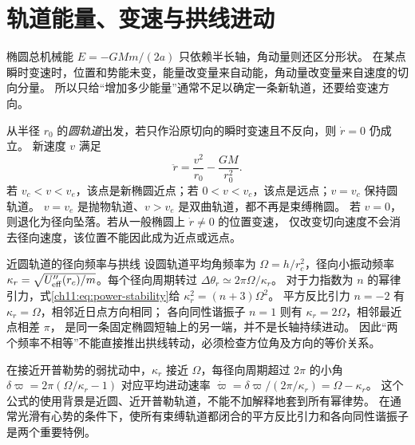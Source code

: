 \section{轨道能量、变速与拱线进动}
椭圆总机械能 $E=-GMm/(2a)$ 只依赖半长轴，角动量则还区分形状。
在某点瞬时变速时，位置和势能未变，能量改变量来自动能，角动量改变量来自速度的切向分量。
所以只给“增加多少能量”通常不足以确定一条新轨道，还要给变速方向。

从半径 $r_0$ 的\emph{圆轨道}出发，若只作沿原切向的瞬时变速且不反向，则 $\dot r=0$ 仍成立。
新速度 $v$ 满足
\[
 \ddot r=\frac{v^2}{r_0}-\frac{GM}{r_0^2}.
\]
若 $v_c<v<v_e$，该点是新椭圆近点；若 $0<v<v_c$，该点是远点；$v=v_c$ 保持圆轨道。
$v=v_e$ 是抛物轨道、$v>v_e$ 是双曲轨道，都不再是束缚椭圆。
若 $v=0$，则退化为径向坠落。若从一般椭圆上 $\dot r\ne0$ 的位置变速，
仅改变切向速度不会消去径向速度，该位置不能因此成为近点或远点。


\begin{starread}{近圆轨道的径向频率与拱线}
\label{ch11:sec:precession}
设圆轨道平均角频率为 $\Omega=h/r_c^2$，径向小振动频率
$\kappa_r=\sqrt{U_{\rm eff}''(r_c)/m}$。每个径向周期转过
$\Delta\theta_r\simeq2\pi\Omega/\kappa_r$。
对于力指数为 $n$ 的幂律引力，式\eqref{ch11:eq:power-stability}给
$\kappa_r^2=(n+3)\Omega^2$。
平方反比引力 $n=-2$ 有 $\kappa_r=\Omega$，相邻近日点方向相同；
各向同性谐振子 $n=1$ 则有 $\kappa_r=2\Omega$，相邻最近点相差 $\pi$，
是同一条固定椭圆短轴上的另一端，并不是长轴持续进动。
因此“两个频率不相等”不能直接推出拱线转动，必须检查方位角及方向的等价关系。

在接近开普勒势的弱扰动中，$\kappa_r$ 接近 $\Omega$，每径向周期超过 $2\pi$ 的小角
$\delta\varpi=2\pi(\Omega/\kappa_r-1)$ 对应平均进动速率
$\dot\varpi=\delta\varpi/(2\pi/\kappa_r)=\Omega-\kappa_r$。
这个公式的使用背景是近圆、近开普勒轨道，不能不加解释地套到所有幂律势。
在通常光滑有心势的条件下，使所有束缚轨道都闭合的平方反比引力和各向同性谐振子是两个重要特例。
\end{starread}
